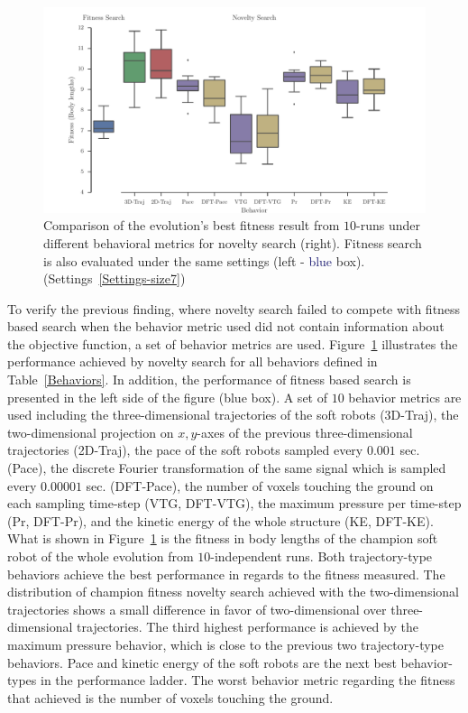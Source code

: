 \begin{figure}[t!]
\centering
\includegraphics[width=1.0\textwidth]{../Figures/Results/BehaviorsPerformance.pdf}
\caption{Comparison of the evolution's best fitness result from $10$-runs under different behavioral metrics for novelty search (right). Fitness search is also evaluated under the same settings (left - \textcolor{MidnightBlue}{blue} box). (Settings~\ref{Settings-size7})}
\label{fig:BehaviorsPerformance}
\end{figure}

To verify the previous finding, where novelty search failed to compete with fitness based search when the behavior metric used did not contain information about the objective function, a set of behavior metrics are used. Figure~\ref{fig:BehaviorsPerformance} illustrates the performance achieved by novelty search for all behaviors defined in Table~\ref{Behaviors}. In addition, the performance of fitness based search is presented in the left side of the figure (\textcolor{NavyBlue}{blue} box). A set of $10$ behavior metrics are used including the three-dimensional trajectories of the soft robots (3D-Traj), the two-dimensional projection on $x,y$-axes of the previous three-dimensional trajectories (2D-Traj), the pace of the soft robots sampled every $0.001$ sec. (Pace), the discrete Fourier transformation of the same signal which is sampled every $0.00001$ sec. (DFT-Pace), the number of voxels touching the ground on each sampling time-step (VTG, DFT-VTG), the maximum pressure per time-step (Pr, DFT-Pr), and the kinetic energy of the whole structure (KE, DFT-KE). What is shown in Figure~\ref{fig:BehaviorsPerformance} is the fitness in body lengths of the champion soft robot of the whole evolution from $10$-independent runs.  Both trajectory-type behaviors achieve the best performance in regards to the fitness measured. The distribution of champion fitness novelty search achieved with the two-dimensional trajectories shows a small difference in favor of two-dimensional over three-dimensional trajectories. The third highest performance is achieved by the maximum pressure behavior, which is close to the previous two trajectory-type behaviors. Pace and kinetic energy of the soft robots are the next best behavior-types in the performance ladder. The worst behavior metric regarding the fitness that achieved is the number of voxels touching the ground.

